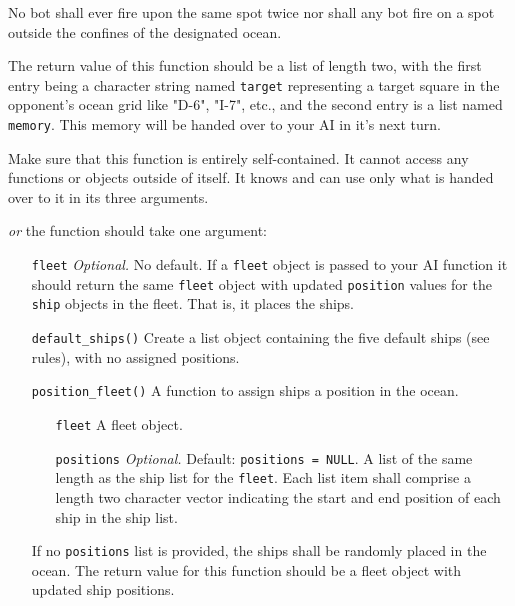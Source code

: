 \documentclass[
]{article}
\begin{document}
\begin{itemize}
\begin{itemize}
No bot shall ever fire upon the same spot twice nor shall any bot fire on a spot outside the confines of the designated ocean.
      
The return value of this function should be a list of length two, with the first entry being a character string named \texttt{target} representing a target square in the opponent's ocean grid like "D-6", "I-7", etc., and the second entry is a list named \texttt{memory}. This memory will be handed over to your AI in it's next turn.

Make sure that this function is entirely self-contained. It cannot access any functions or objects outside of itself. It knows and can use only what is handed over to it in its three arguments.
\end{itemize}
\end{itemize}

\emph{or} the function should take one argument:

\begin{itemize}
      \item[\texttt{fleet}] \emph{Optional.} No default. If a \texttt{fleet} object is passed to your AI function it should return the same \texttt{fleet} object with updated \texttt{position} values for the \texttt{ship} objects in the fleet. That is, it places the ships.
\end{itemize}

\begin{itemize}
\item[\texttt{default\_ships()}] Create a list object containing the five default ships (see rules), with no assigned positions.

\item[\texttt{position\_fleet()}] A function to assign ships a position in the ocean.
  \begin{itemize}
    \item[\texttt{fleet}] A fleet object.
    \item[\texttt{positions}] \emph{Optional.} Default: \texttt{positions = NULL}. A list of the same length as the ship list for the \texttt{fleet}. Each list item shall comprise a length two character vector indicating the start and end position of each ship in the ship list.
  \end{itemize}
  If no \texttt{positions} list is provided, the ships shall be randomly placed in the ocean.
  The return value for this function should be a fleet object with updated ship positions.
\end{itemize}
\end{document}
